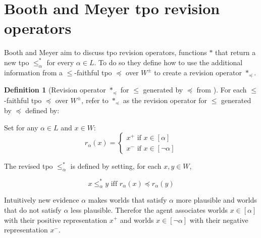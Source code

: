 \documentclass[english, 12pt]{scrartcl}
\theoremstyle{definition}
\theoremstyle{definition}
\newtheorem{definition}{Definition}
\theoremstyle{definition}
\begin{document}
\section{Booth and Meyer tpo revision operators}
Booth and Meyer \cite{Booth2011} aim to discuss tpo revision operators, functions $\ast$ that return a new tpo $\leq_{\alpha}^{\ast}$ for every $\alpha \in L$. To do so they define how to use the additional information from a $\leq$-faithful tpo $\preceq$ over $W^{\pm}$ to create a revision operator $\ast_{\preceq}$.

\begin{definition}[Revision operator $\ast_{\preceq}$ for $\leq$ generated by $\preceq$ from \cite{Booth2011}]
    \label{definition:revision-operator}
    For each $\leq$-faithful tpo $\preceq$ over $W^{\pm}$, refer to $\ast_{\preceq}$ as the revision operator for $\leq$ generated by $\preceq$ defined by:
    
    Set for any $\alpha \in L$ and $x \in W$:
    \begin{equation*}
        r_{\alpha}(x) = \left\{
                    \begin{array}{ll}
                      x^{+} \textrm{ if } x \in [\alpha]\\
                      x^{-} \textrm{ if } x \in [\neg\alpha]
                    \end{array}
                  \right.
    \end{equation*}
    
    The revised tpo $\leq_{\alpha}^{\ast}$ is defined by setting, for each $x, y \in W$,

    \begin{equation*}
        x \leq_{\alpha}^{\ast} y \textrm{ iff } r_{\alpha}(x) \preceq r_{\alpha}(y)
    \end{equation*}
\end{definition}

Intuitively new evidence $\alpha$ makes worlds that satisfy $\alpha$ more plausible and worlds that do not satisfy $\alpha$ less plausible. Therefor the agent associates worlds $x \in [\alpha]$ with their positive representation $x^{+}$ and worlds $x \in [\neg\alpha]$ with their negative representation $x^{-}$.
\end{document}
